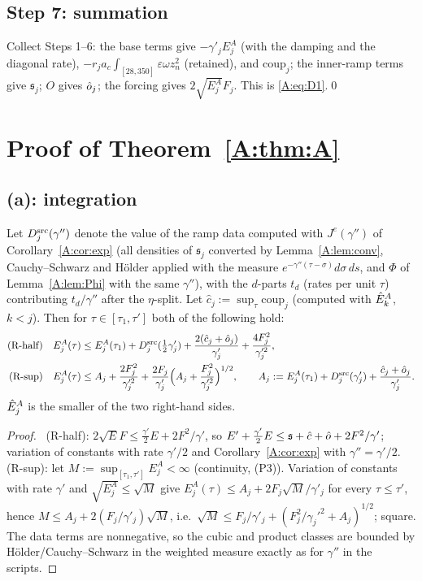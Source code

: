 \documentclass[11pt]{article}
\begin{document}
\subsection{Step 7: summation}
Collect Steps 1--6: the base terms give $-\gamma'_jE^A_j$ (with the damping and the diagonal rate), $-r_ja_c\int_{[28,350]}\varepsilon\omega z_n^2$ (retained), and $\mathrm{coup}_j$; the inner-ramp terms give $\mathfrak s_j$; $O$ gives $\hat o_j$; the forcing gives $2\sqrt{E^A_j}F_j$. This is \eqref{A:eq:D1}.\qed

\section{Proof of Theorem~\ref{A:thm:A}}\label{A:sec:int}
\subsection{(a): integration}
\begin{lemma}\label{A:lem:int}
Let $D^{\rm src}_j(\gamma'')$ denote the value of the ramp data computed with $J^e(\gamma'')$ of Corollary~\ref{A:cor:exp} (all densities of $\mathfrak s_j$ converted by Lemma~\ref{A:lem:conv}, Cauchy--Schwarz and H\"older applied with the measure $e^{-\gamma''(\tau-\sigma)}d\sigma\,ds$, and $\Phi$ of Lemma~\ref{A:lem:Phi} with the same $\gamma''$), with the $d$-parts $t_d$ (rates per unit $\tau$) contributing $t_d/\gamma''$ after the $\eta$-split. Let $\hat c_j:=\sup_\tau\mathrm{coup}_j$ (computed with $\hat E^A_k$, $k<j$). Then for $\tau\in[\tau_1,\tau']$ both of the following hold:
\begin{align*}
\text{(R-half)}\quad &E^A_j(\tau)\le E^A_j(\tau_1)+D^{\rm src}_j(\tfrac12\gamma'_j)+\frac{2(\hat c_j+\hat o_j)}{\gamma'_j}+\frac{4F_j^2}{\gamma_j'^2},\\
\text{(R-sup)}\quad &E^A_j(\tau)\le A_j+\frac{2F_j^2}{\gamma_j'^2}+\frac{2F_j}{\gamma'_j}\Bigl(A_j+\frac{F_j^2}{\gamma_j'^2}\Bigr)^{1/2},\qquad A_j:=E^A_j(\tau_1)+D^{\rm src}_j(\gamma'_j)+\frac{\hat c_j+\hat o_j}{\gamma'_j}.
\end{align*}
$\hat E^A_j$ is the smaller of the two right-hand sides.
\end{lemma}
\begin{proof}\tP\ (R-half): $2\sqrt EF\le\frac{\gamma'}2E+2F^2/\gamma'$, so $E'+\frac{\gamma'}2E\le\mathfrak s+\hat c+\hat o+2F^2/\gamma'$; variation of constants with rate $\gamma'/2$ and Corollary~\ref{A:cor:exp} with $\gamma''=\gamma'/2$. (R-sup): let $M:=\sup_{[\tau_1,\tau']}E^A_j<\infty$ (continuity, (P3)). Variation of constants with rate $\gamma'$ and $\sqrt{E^A_j}\le\sqrt M$ give $E^A_j(\tau)\le A_j+2F_j\sqrt M/\gamma'_j$ for every $\tau\le\tau'$, hence $M\le A_j+2(F_j/\gamma'_j)\sqrt M$, i.e.\ $\sqrt M\le F_j/\gamma'_j+(F_j^2/\gamma_j'^2+A_j)^{1/2}$; square. The data terms are nonnegative, so the cubic and product classes are bounded by H\"older/Cauchy--Schwarz in the weighted measure exactly as for $\gamma''$ in the scripts.
\end{proof}
\end{document}
